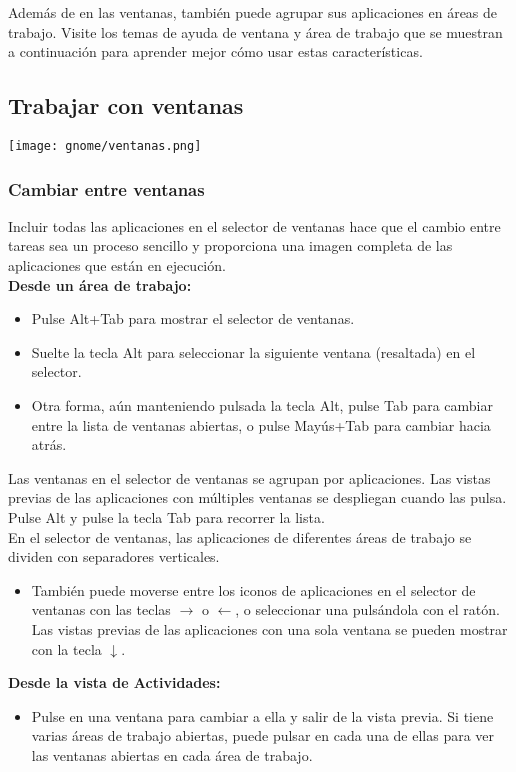 Además de en las ventanas, también puede agrupar sus aplicaciones en áreas de trabajo. Visite los temas de ayuda de ventana y área de trabajo que se muestran a continuación para aprender mejor cómo usar estas características.

\subsection{Trabajar con ventanas}
\begin{center}
\texttt{[image: gnome/ventanas.png]} 
\end{center}
\subsubsection{Cambiar entre ventanas}
Incluir todas las aplicaciones en el selector de ventanas hace que el cambio entre tareas sea un proceso sencillo y proporciona una imagen completa de las aplicaciones que están en ejecución.\\

{\bf Desde un área de trabajo:}
\begin{itemize}
\item Pulse Alt+Tab para mostrar el selector de ventanas.
\item Suelte la tecla Alt para seleccionar la siguiente ventana (resaltada) en el selector.
\item Otra forma, aún manteniendo pulsada la tecla Alt, pulse Tab para cambiar entre la lista de ventanas abiertas, o pulse Mayús+Tab para cambiar hacia atrás.
\end{itemize}
Las ventanas en el selector de ventanas se agrupan por aplicaciones. Las vistas previas de las aplicaciones con múltiples ventanas se despliegan cuando las pulsa. Pulse Alt y pulse la tecla Tab para recorrer la lista.\\
En el selector de ventanas, las aplicaciones de diferentes áreas de trabajo se dividen con separadores verticales.

\begin{itemize}
\item También puede moverse entre los iconos de aplicaciones en el selector de ventanas con las teclas $→$ o $←$, o seleccionar una pulsándola con el ratón.\\
Las vistas previas de las aplicaciones con una sola ventana se pueden mostrar con la tecla $↓$.
\end{itemize}
{\bf Desde la vista de Actividades:}
\begin{itemize}
\item Pulse en una ventana para cambiar a ella y salir de la vista previa. Si tiene varias áreas de trabajo abiertas, puede pulsar en cada una de ellas para ver las ventanas abiertas en cada área de trabajo.
\end{itemize}
